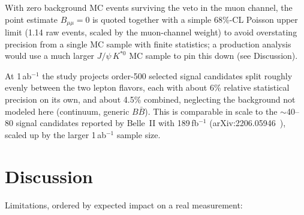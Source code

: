 \documentclass[11pt]{article}
\newcommand{\Kst}{K^{*0}}
\newcommand{\jpsi}{J/\psi}
\begin{document}
With zero background MC events surviving the veto in the muon channel,
the point estimate $B_{\mu\mu} = 0$ is quoted together with a simple
68\%-CL Poisson upper limit (1.14 raw events, scaled by the muon-channel
weight) to avoid overstating precision from a single MC sample with
finite statistics; a production analysis would use a much larger
$\jpsi\,\Kst$ MC sample to pin this down (see Discussion).

At 1\,ab$^{-1}$ the study projects order-500 selected signal candidates
split roughly evenly between the two lepton flavors, each with about 6\%
relative statistical precision on its own, and about 4.5\% combined,
neglecting the background not modeled here (continuum, generic
$B\bar B$). This is comparable in scale to the $\sim$40--80 signal
candidates reported by Belle~II with 189\,fb$^{-1}$
(arXiv:2206.05946~\cite{BelleII:2206}), scaled up by the larger
1\,ab$^{-1}$ sample size.

\section{Discussion}
\label{sec:discussion}

Limitations, ordered by expected impact on a real measurement:
\end{document}
